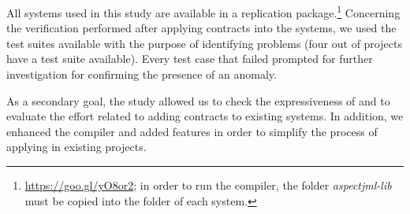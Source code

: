 All systems used in this study are available in a replication
package.\footnote{\url{https://goo.gl/yO8or2}; in order to run the
\contractjdoc{} compiler, the folder \textit{aspectjml-lib} must be copied into the folder of each system.}
Concerning the verification performed after applying \contractjdoc{} contracts into the systems,
we used the test suites available with the purpose of identifying problems
(four out of \totalSystems{} projects have a test suite available).
Every test case that failed prompted for further investigation for confirming the presence of an anomaly.

As a secondary goal, the study allowed us to check the expressiveness of \contractjdoc{} and to
evaluate the effort related to adding contracts to existing systems.
In addition, we enhanced the compiler and added features in order to simplify
the process of applying \contractjdoc{} in existing projects.

